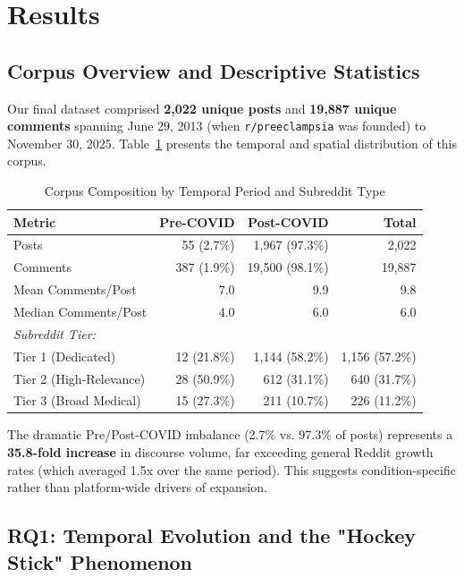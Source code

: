 \documentclass[12pt, a4paper]{article}
\begin{document}
\section{Results}

\subsection{Corpus Overview and Descriptive Statistics}
Our final dataset comprised \textbf{2,022 unique posts} and \textbf{19,887 unique comments} spanning June 29, 2013 (when \texttt{r/preeclampsia} was founded) to November 30, 2025. Table~\ref{tab:corpus} presents the temporal and spatial distribution of this corpus.

\begin{table}[H]
\centering
\caption{Corpus Composition by Temporal Period and Subreddit Type}
\label{tab:corpus}
\begin{tabular}{lrrr}
\toprule
\textbf{Metric} & \textbf{Pre-COVID} & \textbf{Post-COVID} & \textbf{Total} \\
\midrule
Posts & 55 (2.7\%) & 1,967 (97.3\%) & 2,022 \\
Comments & 387 (1.9\%) & 19,500 (98.1\%) & 19,887 \\
Mean Comments/Post & 7.0 & 9.9 & 9.8 \\
Median Comments/Post & 4.0 & 6.0 & 6.0 \\
\midrule
\textit{Subreddit Tier:} & & & \\
Tier 1 (Dedicated) & 12 (21.8\%) & 1,144 (58.2\%) & 1,156 (57.2\%) \\
Tier 2 (High-Relevance) & 28 (50.9\%) & 612 (31.1\%) & 640 (31.7\%) \\
Tier 3 (Broad Medical) & 15 (27.3\%) & 211 (10.7\%) & 226 (11.2\%) \\
\bottomrule
\end{tabular}
\end{table}

The dramatic Pre/Post-COVID imbalance (2.7\% vs. 97.3\% of posts) represents a \textbf{35.8-fold increase} in discourse volume, far exceeding general Reddit growth rates (which averaged 1.5x over the same period). This suggests condition-specific rather than platform-wide drivers of expansion.

\subsection{RQ1: Temporal Evolution and the "Hockey Stick" Phenomenon}
\end{document}
